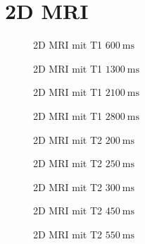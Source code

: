 \section{2D MRI}
    \begin{figure}[H]
        \centering
        
        \caption{2D MRI mit T1 $\SI{600}{\milli\second}$}
    \end{figure}
    \begin{figure}[H]
        \centering
        
        \caption{2D MRI mit T1 $\SI{1300}{\milli\second}$}
    \end{figure}
    \begin{figure}[H]
        \centering
        
        \caption{2D MRI mit T1 $\SI{2100}{\milli\second}$}
    \end{figure}
    \begin{figure}[H]
        \centering
        
        \caption{2D MRI mit T1 $\SI{2800}{\milli\second}$}
    \end{figure}
    \begin{figure}[H]
        \centering
        
        \caption{2D MRI mit T2 $\SI{200}{\milli\second}$}
    \end{figure}
    \begin{figure}[H]
        \centering
        
        \caption{2D MRI mit T2 $\SI{250}{\milli\second}$}
    \end{figure}
    \begin{figure}[H]
        \centering
        
        \caption{2D MRI mit T2 $\SI{300}{\milli\second}$}
    \end{figure}
    \begin{figure}[H]
        \centering
        
        \caption{2D MRI mit T2 $\SI{450}{\milli\second}$}
    \end{figure}
    \begin{figure}[H]
        \centering
        
        \caption{2D MRI mit T2 $\SI{550}{\milli\second}$}
    \end{figure}

